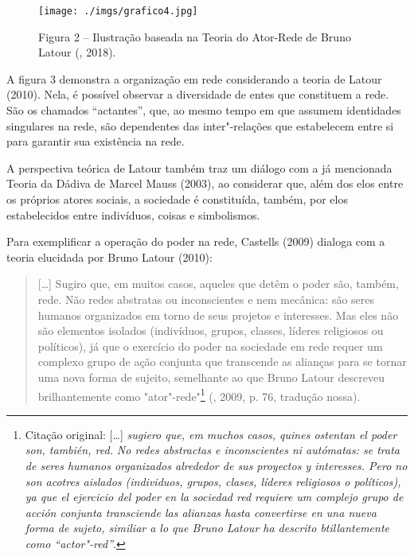 \begin{figure}[!ht]
\centering
  \texttt{[image: ./imgs/grafico4.jpg]}
\caption{Figura 2 -- Ilustração baseada na Teoria do Ator-Rede de Bruno Latour (, 2018).}
 \end{figure}

A figura 3 demonstra a organização em rede considerando a teoria de
Latour (2010). Nela, é possível observar a diversidade de entes que
constituem a rede. São os chamados ``actantes'', que, ao mesmo tempo em
que assumem identidades singulares na rede, são dependentes das
inter"-relações que estabelecem entre si para garantir sua existência na
rede.

A perspectiva teórica de Latour também traz um diálogo com a já
mencionada Teoria da Dádiva de Marcel Mauss (2003), ao considerar que,
além dos elos entre os próprios atores sociais, a sociedade é
constituída, também, por elos estabelecidos entre indivíduos, coisas e
simbolismos.

Para exemplificar a operação do poder na rede, Castells (2009) dialoga
com a teoria elucidada por Bruno Latour (2010):

\begin{quote}
[\ldots{}] Sugiro que, em muitos casos, aqueles que detêm o poder são,
também, rede. Não redes abstratas ou inconscientes e nem mecânica: são
seres humanos organizados em torno de seus projetos e interesses. Mas
eles não são elementos isolados (indivíduos, grupos, classes, líderes
religiosos ou políticos), já que o exercício do poder na sociedade em
rede requer um complexo grupo de ação conjunta que transcende as
alianças para se tornar uma nova forma de sujeito, semelhante ao que
Bruno Latour descreveu brilhantemente como "ator"-rede"\footnote{Citação
  original: [\ldots{}] \emph{sugiero que, em muchos casos, quines ostentan el
    poder son, también, red. No redes abstractas e inconscientes ni
    autómatas: se trata de seres humanos organizados alrededor de sus
    proyectos y interesses. Pero no son acotres aislados (individuos,
    grupos, clases, líderes religiosos o políticos), ya que el ejercicio
    del poder en la sociedad red requiere um complejo grupo de acción
    conjunta transciende las alianzas hasta convertirse en una nueva forma
    de sujeto, similiar a lo que Bruno Latour ha descrito btillantemente
    como ``actor"-red''}.} (, 2009, p. 76, tradução nossa).
\end{quote}

